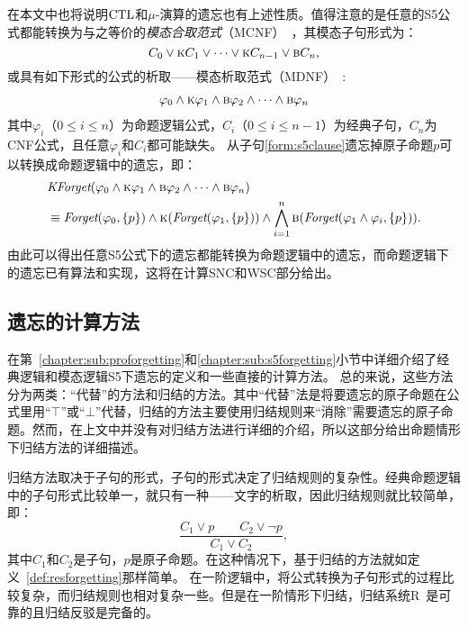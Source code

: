 在本文中也将说明$\textrm{CTL}$和$\mu$-演算的遗忘也有上述性质。值得注意的是任意的S5公式都能转换为与之等价的\emph{模态合取范式}（MCNF）~\cite{DBLP:conf/aaai/Bienvenu07}，其模态子句形式为：
$$C_0 \vee \textsc{k} C_1 \vee \dots \vee \textsc{k} C_{n-1} \vee \textsc{b} C_n,$$
或具有如下形式的公式的析取——模态析取范式（MDNF）~\cite{Yongmei:IJCAI:2011,Zhang2008Properties}:
\begin{align}\label{form:s5clause}
	\varphi_0 \wedge \textsc{k} \varphi_1 \wedge \textsc{b} \varphi_2 \wedge \dots \wedge \textsc{b} \varphi_n
\end{align}
其中$\varphi_i$（$0\leq i \leq n$）为命题逻辑公式，$C_i$（$0\leq i \leq n-1$）为经典子句，$C_n$为CNF公式，且任意$\varphi_i$和$C_i$都可能缺失。
从子句\ref{form:s5clause}遗忘掉原子命题$p$可以转换成命题逻辑中的遗忘，即：
\begin{align*}
	&\textit{KForget}(\varphi_0 \wedge \textsc{k} \varphi_1 \wedge \textsc{b} \varphi_2 \wedge \dots \wedge \textsc{b} \varphi_n)\\
	&\equiv \textit{Forget}(\varphi_0, \{p\}) \wedge \textsc{k}(\textit{Forget}(\varphi_1, \{p\})) \wedge \bigwedge_{i=1}^{n}\textsc{b}(\textit{Forget}(\varphi_1 \wedge \varphi_i, \{p\})).
\end{align*}
由此可以得出任意S5公式下的遗忘都能转换为命题逻辑中的遗忘，而命题逻辑下的遗忘已有算法和实现，这将在计算SNC和WSC部分给出。





\subsection{遗忘的计算方法}
在第~\ref{chapter:sub:proforgetting}和\ref{chapter:sub:s5forgetting}小节中详细介绍了经典逻辑和模态逻辑S5下遗忘的定义和一些直接的计算方法。
总的来说，这些方法分为两类：“代替”的方法和归结的方法。其中“代替”法是将要遗忘的原子命题在公式里用“$\top$”或“$\bot$”代替，归结的方法主要使用归结规则来“消除”需要遗忘的原子命题。然而，在上文中并没有对归结方法进行详细的介绍，所以这部分给出命题情形下归结方法的详细描述。%

归结方法取决于子句的形式，子句的形式决定了归结规则的复杂性。经典命题逻辑中的子句形式比较单一，就只有一种——文字的析取，因此归结规则就比较简单，即：
$$\frac{C_1 \vee p \qquad C_2 \vee \neg p}{C_1 \vee C_2},$$
其中$C_1$和$C_2$是子句，$p$是原子命题。在这种情况下，基于归结的方法就如定义~\ref{def:resforgetting}那样简单。
在一阶逻辑中，将公式转换为子句形式的过程比较复杂，而归结规则也相对复杂一些。但是在一阶情形下归结，归结系统R~\cite{DBLP:books/daglib/0023036}是可靠的且归结反驳是完备的。


